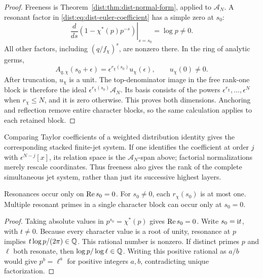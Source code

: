 \begin{proof}
Freeness is Theorem~\ref{dist:thm:dist-normal-form}, applied to
\(\mathcal A_N\). A resonant factor in
\eqref{dist:eq:dist-euler-coefficient} has a simple zero at \(s_0\):
\[
 \left.\frac{d}{ds}
 (1-\chi^*(p)p^{-s})\right|_{s=s_0}=\log p\ne0.
\]
All other factors, including \((q/f_\chi)^s\), are nonzero
there. In the ring of analytic germs,
\[
 A_{q,\chi}(s_0+\epsilon)
   =\epsilon^{r_\chi(s_0)}u_\chi(\epsilon),
 \qquad u_\chi(0)\ne0.
\]
After truncation, \(u_\chi\) is a unit. The
top-denominator image in the free rank-one block is therefore
the ideal \(\epsilon^{r_\chi(s_0)}\mathcal A_N\).
Its basis consists of the powers
\(\epsilon^{r_\chi},\ldots,\epsilon^N\) when \(r_\chi\leq N\),
and it is zero otherwise. This proves both dimensions.
Anchoring and reflection remove entire character blocks,
so the same calculation applies to each retained block.
\end{proof}

Comparing Taylor coefficients of a weighted distribution identity
gives the corresponding stacked finite-jet system. If one identifies
the coefficient at order \(j\) with
\(\epsilon^{N-j}[x]\), its relation space is the
\(\mathcal A_N\)-span above; factorial normalizations merely
rescale coordinates. Thus freeness also gives the rank of the
complete simultaneous jet system, rather than just its successive
highest layers.

\begin{proposition}
\label{dist:prop:dist-resonance-multiplicity}
Resonances occur only on \(\operatorname{Re} s_0=0\).
For \(s_0\ne0\), each \(r_\chi(s_0)\) is at most one.
Multiple resonant primes in a single character block can occur
only at \(s_0=0\).
\end{proposition}

\begin{proof}
Taking absolute values in \(p^{s_0}=\chi^*(p)\) gives
\(\operatorname{Re} s_0=0\). Write \(s_0=\mathrm{i} t\), with \(t\ne0\).
Because every character value is a root of unity, resonance
at \(p\) implies
\(t\log p/(2\pi)\in\mathbb{Q}\). This rational number is nonzero.
If distinct primes \(p\) and \(\ell\) both resonate, then
\(\log p/\log\ell\in\mathbb{Q}\). Writing this positive rational as
\(a/b\) would give \(p^b=\ell^a\) for positive integers \(a,b\),
contradicting unique factorization.
\end{proof}

